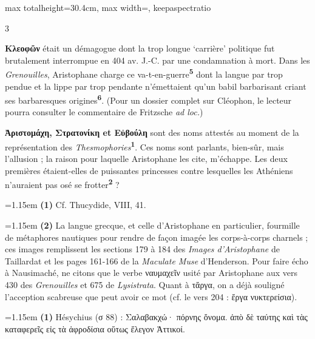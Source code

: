 \documentclass[11pt,twoside]{book}
\newcommand{\italique}[1]{\textit{#1}}
\newcommand{\marqueur}[1]{\textsuperscript{\color{rubricRed}\textbf{#1}}}
\begin{document}
\begin{adjustbox}{max totalheight=30.4cm, max width=\textwidth, keepaspectratio}
\begin{minipage}{\textwidth}
{\begin{multicols}{3}
\par\vspace{1.5pt}
\noindent \textbf{Κλεοφῶν} était un démagogue dont la trop longue `carrière' politique fut brutalement interrompue en 404 av. J.-C. par une condamnation à mort. Dans les \italique{Grenouilles}, Aristophane charge ce va-t-en-guerre\marqueur{5} dont la langue par trop pendue et la lippe par trop pendante n'émettaient qu'un babil barbarisant criant ses barbaresques origines\marqueur{6}. (Pour un dossier complet sur Cléophon, le lecteur pourra consulter le commentaire de Fritzsche \italique{ad loc.})
\par\vspace{1.5pt}
 \textbf{Ἀριστομάχη, Στρατονίκη et Εὐβούλη} sont des noms attestés au moment de la représentation des \italique{Thesmophories}\marqueur{1}. Ces noms sont parlants, bien-sûr, mais l'allusion ; la raison pour laquelle Aristophane les cite, m'échappe. Les deux premières étaient-elles de puissantes princesses contre lesquelles les Athéniens n'auraient pas osé se frotter\marqueur{2} ?
\par\vspace{1.5pt}
\par\vspace{1.2pt}\par\nopagebreak\vspace{1pt}\noindent\hangindent=1.15em {\color{sepiaNote}\textbf{(1)}} Cf. Thucydide, VIII, 41.
\par\vspace{1.5pt}
\noindent\hangindent=1.15em {\color{sepiaNote}\textbf{(2)}} La langue grecque, et celle d'Aristophane en particulier, fourmille de métaphores nautiques pour rendre de façon imagée les corps-à-corps charnels ; ces images remplissent les sections 179 à 184 des \italique{Images d'Aristophane} de Taillardat et les pages 161-166 de la \italique{Maculate Muse} d'Henderson. Pour faire écho à Nausimaché, ne citons que le verbe ναυμαχεῖν usité par Aristophane aux vers 430 des \italique{Grenouilles} et 675 de \italique{Lysistrata}. Quant à τἄργα, on a déjà souligné l'acception scabreuse que peut avoir ce mot (cf. le vers 204 : ἔργα νυκτερείσια).
\par\vspace{1.5pt}
\noindent\hangindent=1.15em {\color{sepiaNote}\textbf{(1)}} Hésychius (σ 88) : Σαλαβακχώ· πόρνης ὄνομα. ἀπὸ δὲ ταύτης καὶ τὰς καταφερεῖς εἰς τὰ ἀφροδίσια οὕτως ἔλεγον Ἀττικοί.

\end{multicols}}
\end{minipage}
\end{adjustbox}
\end{document}
